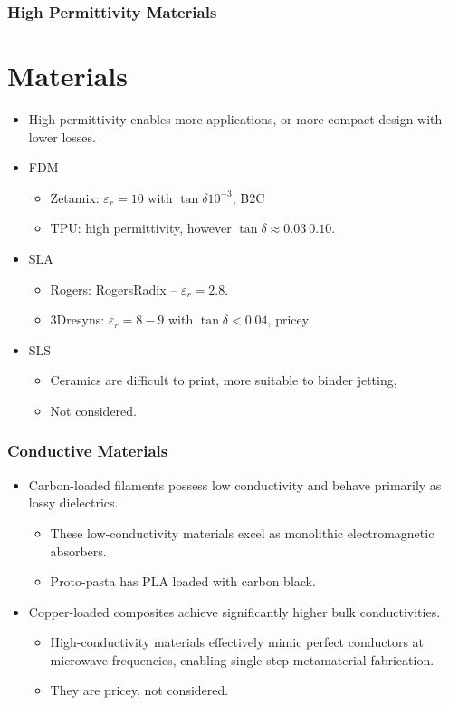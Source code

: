\documentclass[aspectratio=43]{beamer}
\begin{document}
\begin{frame}[fragile]
  \frametitle{High Permittivity Materials}
	\section{Materials}
  \begin{itemize}
		\item High permittivity enables more applications, or more compact design with lower losses.
		\item FDM
			\begin{itemize}
				\item Zetamix: $\varepsilon_r=10$ with $\tan \delta 10^{-3}$, B2C
				\item TPU: high permittivity, however $\tan \delta \approx 0.03 ~ 0.10$.
			\end{itemize}
		\item SLA
			\begin{itemize}
				\item Rogers: RogersRadix -- $\varepsilon_r = 2.8$.
				\item 3Dresyns:  $\varepsilon_r = 8-9$ with $\tan \delta < 0.04$, pricey
			\end{itemize}
		\item SLS
			\begin{itemize}
				\item Ceramics are difficult to print, more suitable to binder jetting,
				\item Not considered.
			\end{itemize}
  \end{itemize}
\end{frame}

\begin{frame}[fragile]
  \frametitle{Conductive Materials}
  \begin{itemize}
    \item Carbon-loaded filaments possess low conductivity and behave primarily as lossy dielectrics.
			\begin{itemize}
				\item These low-conductivity materials excel as monolithic electromagnetic absorbers.
				\item Proto-pasta has PLA loaded with carbon black.
			\end{itemize}
    \item Copper-loaded composites achieve significantly higher bulk conductivities.
			\begin{itemize}
				\item High-conductivity materials effectively mimic perfect conductors at microwave frequencies, enabling single-step metamaterial fabrication.
				\item They are pricey, not considered.
			\end{itemize}
  \end{itemize}
\end{frame}
\end{document}
